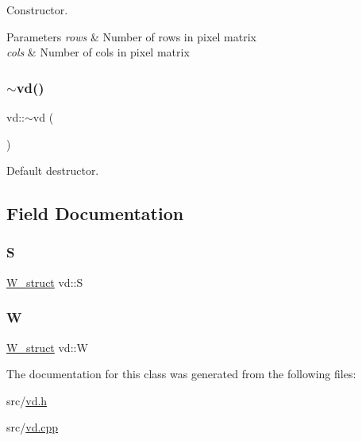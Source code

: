 Constructor. 


\begin{DoxyParams}{Parameters}
{\em rows} & Number of rows in pixel matrix \\
\hline
{\em cols} & Number of cols in pixel matrix \\
\hline
\end{DoxyParams}
\mbox{\label{classvd_a331bc7a75e3f5ea3b750d1d22a9df287}} 
\subsubsection{\texorpdfstring{$\sim$vd()}{~vd()}}
{\footnotesize\ttfamily vd\+::$\sim$vd (\begin{DoxyParamCaption}{ }\end{DoxyParamCaption})}



Default destructor. 



\subsection{Field Documentation}
\mbox{\label{classvd_a960c80ec5b52938f999f528a5e3cccf1}} 
\subsubsection{\texorpdfstring{S}{S}}
{\footnotesize\ttfamily \mbox{\hyperlink{structW__struct}{W\+\_\+struct}} vd\+::S}

\mbox{\label{classvd_ab23d33e6c11c46ad3302a874a4726542}} 
\subsubsection{\texorpdfstring{W}{W}}
{\footnotesize\ttfamily \mbox{\hyperlink{structW__struct}{W\+\_\+struct}} vd\+::W}



The documentation for this class was generated from the following files\+:\begin{DoxyCompactItemize}
\item 
src/\mbox{\hyperlink{vd_8h}{vd.\+h}}\item 
src/\mbox{\hyperlink{vd_8cpp}{vd.\+cpp}}\end{DoxyCompactItemize}
